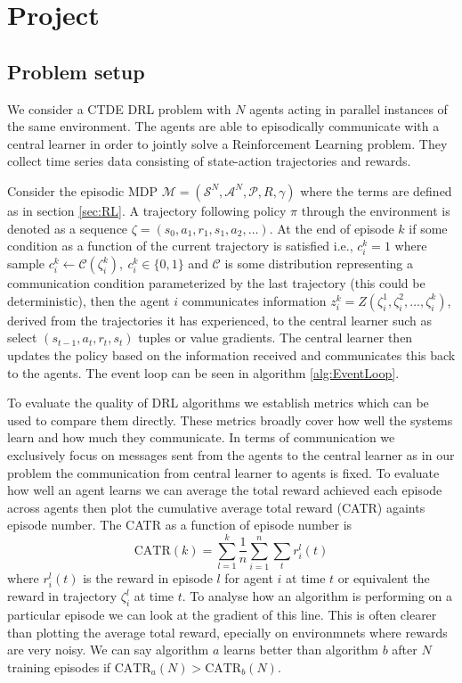 \chapter{Project}

\section{Problem setup}

We consider a CTDE DRL problem with $N$ agents acting in parallel instances of the same environment.
The agents are able to episodically communicate with a central learner in order to jointly solve a Reinforcement Learning problem.
They collect time series data consisting of state-action trajectories and rewards.

Consider the episodic MDP $\mathcal{M}= (\mathcal{S}^N, \mathcal{A}^N, \mathcal{P}, R,\gamma)$ where the terms are defined as in section \ref{sec:RL}.
A trajectory following policy $\pi$ through the environment is denoted as a sequence $\zeta = (s_0, a_1, r_1, s_1, a_2, \dots)$.
At the end of episode $k$ if some condition as a function of the current trajectory is satisfied i.e., $c^k_i=1$ where sample $c^k_i \leftarrow \mathcal{C}(\zeta^k_i), \ c^k_i \in \{0,1\}$ and $\mathcal{C}$ is some distribution representing a communication condition parameterized by the last trajectory (this could be deterministic), then the agent $i$ communicates information $z^k_i=Z(\zeta^1_i,\zeta^2_i,\dots, \zeta^k_i)$, derived from the trajectories it has experienced, to the central learner such as select $(s_{t-1},a_t,r_t,s_t)$ tuples or value gradients.
The central learner then updates the policy based on the information received and communicates this back to the agents. 
The event loop can be seen in algorithm \ref{alg:EventLoop}.


To evaluate the quality of DRL algorithms we establish metrics which can be used to compare them directly. These metrics broadly cover how well the systems learn and how much they communicate. In terms of communication we exclusively focus on messages sent from the agents to the central learner as in our problem the communication from central learner to agents is fixed. To evaluate how well an agent learns we can average the total reward achieved each episode across agents then plot the cumulative average total reward (CATR) againts episode number. The CATR as a function of episode number is 
\begin{equation*}
    \text{CATR}(k) = \sum_{l=1}^k \frac{1}{n} \sum_{i=1}^n \sum_{t} r^l_i(t)
\end{equation*}
where $r^l_i(t)$ is the reward in episode $l$ for agent $i$ at time $t$ or equivalent the reward in trajectory $\zeta^l_i$ at time $t$.
To analyse how an algorithm is performing on a particular episode we can look at the gradient of this line.
This is often clearer than plotting the average total reward, epecially on environmnets where rewards are very noisy.
We can say algorithm $a$ learns better than algorithm $b$ after $N$ training episodes if $\text{CATR}_a(N) > \text{CATR}_b(N)$.

